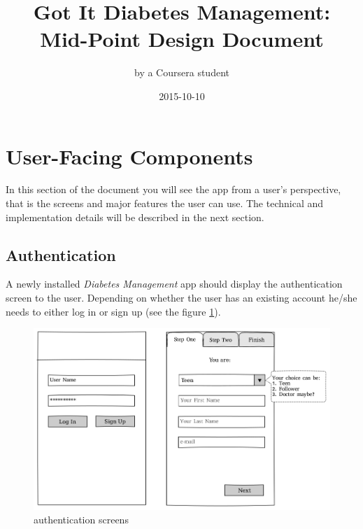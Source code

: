 \documentclass{article}
\title{Got It Diabetes Management:\\Mid-Point Design Document}
\date{2015-10-10}
\author{by a Coursera student}
\begin{document}
    \maketitle
    \newpage

\section{User-Facing Components}

    In this section of the document you will see the app from a user's perspective, that is the screens and major features the user can use. The technical and implementation details will be described in the next section.

\newpage

    \subsection{Authentication}

    A newly installed \emph{Diabetes Management} app should display the authentication screen to the user. Depending on whether the user has an existing account he/she needs to either log in or sign up (see the figure \ref{fig:screen_auth}).

    \begin{figure}[h]
        \centering
        \includegraphics[width=\textwidth,height=\textheight,keepaspectratio]{auth.png}
        \caption{authentication screens}
        \label{fig:screen_auth}
    \end{figure}
\end{document}
